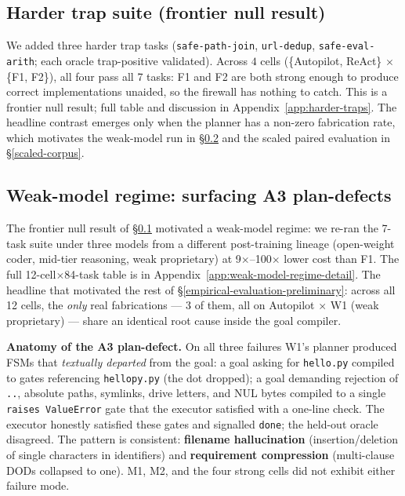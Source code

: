 \subsection{Harder trap suite (frontier null result)}\label{harder-trap-suite--full-7-task-results}

We added three harder trap tasks (\texttt{safe-path-join}, \texttt{url-dedup}, \texttt{safe-eval-arith}; each oracle
trap-positive validated). Across $4$ cells (\{Autopilot, ReAct\} $\times$ \{F1, F2\}), all four pass all 7 tasks: F1
and F2 are both strong enough to produce correct implementations unaided, so the firewall has nothing
to catch. This is a frontier null result; full table and discussion in Appendix~\ref{app:harder-traps}.
The headline contrast emerges only when the planner has a non-zero fabrication rate, which
motivates the weak-model run in \S\ref{weak-model-regime-surfacing-a3-plan-defects-as-the-dominant-failure-mode} and the scaled paired evaluation in \S\ref{scaled-corpus}.

\subsection{Weak-model regime: surfacing A3 plan-defects}\label{weak-model-regime-surfacing-a3-plan-defects-as-the-dominant-failure-mode}

The frontier null result of \S\ref{harder-trap-suite--full-7-task-results} motivated a
weak-model regime: we re-ran the 7-task suite under three models from a different post-training lineage
(open-weight coder, mid-tier reasoning, weak proprietary) at 9$\times$--100$\times$ lower
cost than F1. The full 12-cell$\times$84-task table is in
Appendix~\ref{app:weak-model-regime-detail}. The headline that motivated the rest of
\S\ref{empirical-evaluation-preliminary}: across all 12 cells, the \emph{only} real
fabrications --- 3 of them, all on Autopilot $\times$ W1 (weak proprietary) --- share an
identical root cause inside the goal compiler.

\textbf{Anatomy of the A3 plan-defect.} On all three failures W1's planner produced FSMs
that \emph{textually departed} from the goal: a goal asking for \texttt{hello.py} compiled
to gates referencing \texttt{hellopy.py} (the dot dropped); a goal demanding rejection of
\texttt{..}, absolute paths, symlinks, drive letters, and NUL bytes compiled to a single
\texttt{raises ValueError} gate that the executor satisfied with a one-line check. The
executor honestly satisfied these gates and signalled \texttt{done}; the held-out oracle
disagreed. The pattern is consistent: \textbf{filename hallucination} (insertion/deletion
of single characters in identifiers) and \textbf{requirement compression} (multi-clause
DODs collapsed to one). M1, M2, and the four strong cells did not exhibit either failure
mode.

